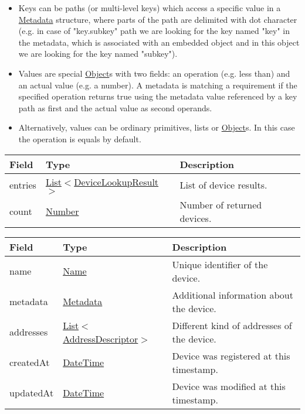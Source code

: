 \documentclass[a4paper]{arrowhead}
\newcommand{\pref}[1]{{\textcolor{ArrowheadGrey}{\hyperref[sec:model:primitives:#1]{#1}}}}
\begin{document}
\begin{itemize}
    \item Keys can be paths (or multi-level keys) which access a specific value in a \hyperref[sec:model:Metadata]{Metadata} structure, where parts of the path are delimited with dot character (e.g. in case of "key.subkey" path we are looking for the key named "key" in the metadata, which is associated with an embedded object and in this object we are looking for the key named "subkey").
    \item Values are special \pref{Object}s with two fields: an operation (e.g. less than) and an actual value (e.g. a number). A metadata is matching a requirement if the specified operation returns true using the metadata value referenced by a key path as first and the actual value as second operands. 
    \item Alternatively, values can be ordinary primitives, lists or \pref{Object}s. In this case the operation is equals by default.
\end{itemize}


\begin{table}[ht!]
\begin{tabularx}{\textwidth}{| p{3cm} | p{6cm} | X |} \hline
\rowcolor{gray!33} Field & Type      & Description \\ \hline
entries & \pref{List}$<$\hyperref[sec:model:DeviceLookupResult]{DeviceLookupResult}$>$     & List of device results. \\ \hline
count & \pref{Number} & Number of returned devices. \\ \hline
\end{tabularx}
\end{table}

 
\begin{table}[ht!]
\begin{tabularx}{\textwidth}{| p{4.25cm} | p{4cm} | X |} \hline
\rowcolor{gray!33} Field & Type      & Description \\ \hline
name & \pref{Name} & Unique identifier of the device. \\ \hline
metadata & \hyperref[sec:model:Metadata]{Metadata} & Additional information about the device. \\ \hline
addresses &  \pref{List}$<$\hyperref[sec:model:AddressDescriptor]{AddressDescriptor}$>$ & Different kind of addresses of the device.  \\ \hline
createdAt & \pref{DateTime} & Device was registered at this timestamp. \\ \hline
updatedAt & \pref{DateTime} & Device was modified at this timestamp. \\ \hline
\end{tabularx}
\end{table}
\end{document}
